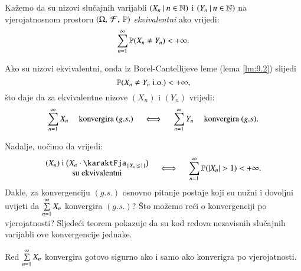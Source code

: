 \begin{defn}    \label{defn:13.6}
    Ka\v zemo da su nizovi slu\v cajnih varijabli $({X_n} \: | \: {n \in \mathbb{N}})$ i $({Y_n} \: | \: {n \in \mathbb{N}})$ na vjerojatnosnom prostoru $(\Omega, \: \mathcal{F}, \: \mathbb{P})$ \emph{ekvivalentni} ako vrijedi:
    \begin{equation*}
        \sum\limits_{n = 1}^{\infty} \mathbb{P}({X_n \neq Y_n}) < +\infty.
    \end{equation*}
\end{defn}

Ako su nizovi ekvivalentni, onda iz Borel-Cantellijeve leme (lema \ref{lm:9.2}) slijedi
\begin{equation*}
    \mathbb{P}({X_n \neq Y_n \; \mathrm{i.o.}}) < +\infty,
\end{equation*}
\v sto daje da za ekvivalentne nizove $(X_n)$ i $(Y_n)$ vrijedi:
\begin{equation}    \label{jed:13.7}
    \sum\limits_{n = 1}^{\infty} X_n \quad \textnormal{ konvergira } (g.s.) \quad \iff \quad \sum\limits_{n = 1}^{\infty} Y_n \quad \textnormal{ konvergira } (g.s).
\end{equation}

Nadalje, uo\v cimo da vrijedi:
\begin{equation}    \label{jed:13.8}
    \begin{matrix}
        (X_n) \textnormal{ i } \big(X_n \cdot \karaktFja_{\{ |X_n| \leq 1 \}}\big)\\
        \textnormal{su ekvivalentni}
    \end{matrix}
    \quad \iff \quad
    \suma{n = 1}{\infty} \vjeroj{|X_n|>1} < +\infty.
\end{equation}
Dakle, za konvergenciju $(g.s.)$ osnovno pitanje postaje koji su nu\v zni i dovoljni uvijeti da $\sum\limits_{n = 1}^{\infty} X_n$ konvergira $(g.s.)$?
\v Sto mo\v zemo re\' ci o konvergenciji po vjerojatnosti?
Sljede\' ci teorem pokazuje da su kod redova nezavisnih slu\v cajnih varijabli ove konvergencije jednake.

\begin{tm}[P. L\' evy]  \label{tm:13.9}
    Red $\sum\limits_{n = 1}^{\infty} X_n$ konvergira gotovo sigurno ako i samo ako konverigra po vjerojatnosti.
\end{tm}

